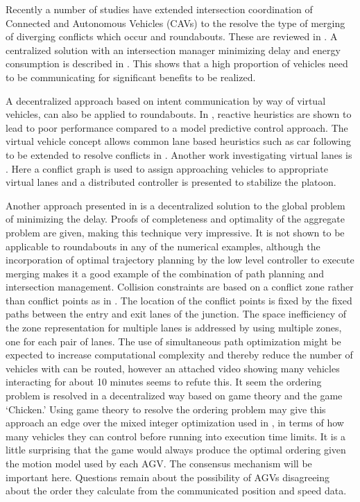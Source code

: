 \documentclass[11pt]{article} %
\begin{document}
Recently a number of studies have extended intersection coordination of Connected and Autonomous Vehicles (CAVs) to the resolve the type of merging of diverging conflicts which occur and roundabouts. These are reviewed in \cite{Rios-Torres2017}. A centralized solution with an intersection manager minimizing delay and energy consumption is described in \cite{Zhao2018}. This shows that a high proportion of vehicles need to be communicating for significant benefits to be realized. 

A decentralized approach based on intent communication by way of virtual vehicles, can also be applied to roundabouts. In \cite{Debada2016}, reactive heuristics are shown to lead to poor performance compared to a model predictive control approach. The virtual vehicle concept allows common lane based heuristics such as car following to be extended to resolve conflicts in  \cite{Debada2018}. Another work investigating virtual lanes is \cite{Xu2018}. Here a conflict graph is used to assign approaching vehicles to appropriate virtual lanes and a distributed controller is presented to stabilize the platoon.

Another approach presented in \cite{Liu2018} is a decentralized solution to the global problem of minimizing the delay. Proofs of completeness and optimality of the aggregate problem are given, making this technique very impressive. It is not shown to be applicable to roundabouts in any of the numerical examples, although the incorporation of optimal trajectory planning by the low level controller to execute merging makes it a good example of the combination of path planning and intersection management. Collision constraints are based on a conflict zone rather than conflict points as in \cite{Levin2017}. The location of the conflict points is fixed by the fixed paths between the entry and exit lanes of the junction. The space inefficiency of the zone representation for multiple lanes is addressed by using multiple zones, one for each pair of lanes. The use of simultaneous path optimization might be expected to increase computational complexity and thereby reduce the number of vehicles with can be routed, however an attached video showing many vehicles interacting for about 10 minutes seems to refute this. It seem the ordering problem is resolved in a decentralized way based on game theory and the game `Chicken.' Using game theory to resolve the ordering problem may give this approach an edge over the mixed integer optimization used in \cite{Levin2017}, in terms of how many vehicles they can control before running into execution time limits. It is a little surprising that the game would always produce the optimal ordering given the motion model used by each AGV. The consensus mechanism will be important here. Questions remain about the possibility of AGVs disagreeing about the order they calculate from the communicated position and speed data. 
\end{document}
